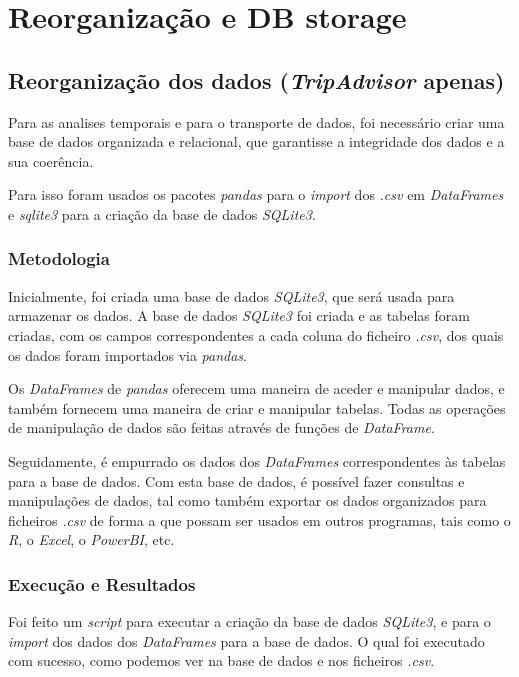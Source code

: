 \chapter{Reorganização e DB storage}
\label{cap8}

\section{Reorganização dos dados (\textit{TripAdvisor} apenas)}

Para as analises temporais e para o transporte de dados, foi necessário criar uma base de dados organizada e relacional, que garantisse a integridade dos dados e a sua coerência.

Para isso foram usados os pacotes \textit{pandas} para o \textit{import} dos \textit{.csv} em \textit{DataFrames} e \textit{sqlite3} para a criação da base de dados \textit{SQLite3}.

\subsection{Metodologia}

Inicialmente, foi criada uma base de dados \textit{SQLite3}, que será usada para armazenar os dados. A base de dados \textit{SQLite3} foi criada e as tabelas foram criadas, com os campos correspondentes a cada coluna do ficheiro \textit{.csv}, dos quais os dados foram importados via \textit{pandas}. 

Os \textit{DataFrames} de \textit{pandas} oferecem uma maneira de aceder e manipular dados, e também fornecem uma maneira de criar e manipular tabelas. Todas as operações de manipulação de dados são feitas através de funções de \textit{DataFrame}.

Seguidamente, é empurrado os dados dos \textit{DataFrames} correspondentes às tabelas para a base de dados. Com esta base de dados, é possível fazer consultas e manipulações de dados, tal como também exportar os dados organizados para ficheiros \textit{.csv} de forma a que possam ser usados em outros programas, tais como o \textit{R}, o \textit{Excel}, o \textit{PowerBI}, etc.

\subsection{Execução e Resultados}

Foi feito um \textit{script} para executar a criação da base de dados \textit{SQLite3}, e para o \textit{import} dos dados dos \textit{DataFrames} para a base de dados. O qual foi executado com sucesso, como podemos ver na base de dados e nos ficheiros \textit{.csv}.


